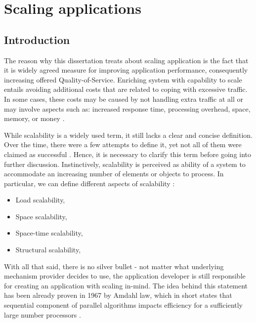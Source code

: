 \chapter{Scaling applications}

\section{Introduction}

The reason why this dissertation treats about scaling application is the fact that it is widely agreed measure for improving application performance, consequently increasing offered Quality-of-Service. Enriching system with capability to scale entails avoiding additional costs that are related to coping with excessive traffic. In some cases, these costs may be caused by not handling extra traffic at all or may involve aspects such as: increased response time, processing overhead, space, memory, or money \cite{Bo00}. 

While scalability is a widely used term, it still lacks a clear and concise definition. Over the time, there were a few attempts to define it, yet not all of them were claimed as successful \cite{Hi90} \cite{DuRoWi06}. Hence, it is necessary to clarify this term before going into further discussion. Instinctively, scalability is perceived as ability of a system to accommodate an increasing number of elements or objects to process. In particular, we can define different aspects of scalability \cite{Bo00}:
\begin{itemize}
	\item Load scalability,
	\item Space scalability,
	\item Space-time scalability,
	\item Structural scalability,
\end{itemize}


With all that said, there is no silver bullet - not matter what underlying mechanism provider decides to use, the application developer is still responsible for creating an application with scaling in-mind. The idea behind this statement has been already proven in 1967 by Amdahl law, which in short states that sequential component of parallel algorithms impacts efficiency for a sufficiently large number processors \cite{Am67}.


